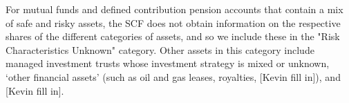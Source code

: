 

For mutual funds and defined contribution pension accounts that contain a 
mix of safe and risky assets, the SCF does not obtain information on the 
respective shares of the different categories of assets, and so we include 
these in the "Risk Characteristics Unknown" category.  Other assets in this 
category include managed investment trusts whose investment strategy 
is mixed or unknown, `other financial assets' (such as oil and gas leases,
royalties, [Kevin fill in]), and [Kevin fill in].


